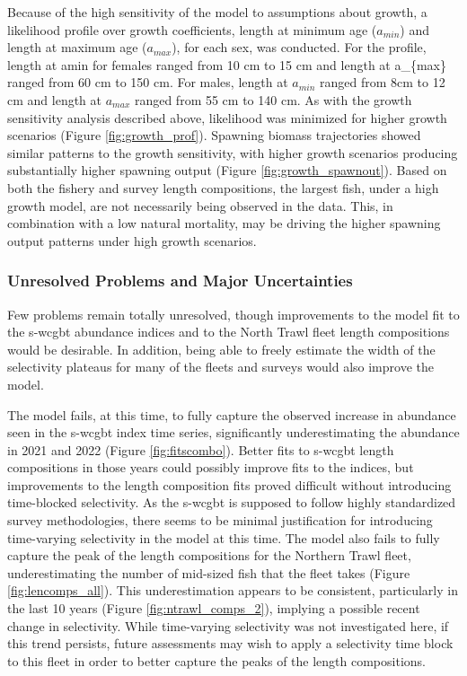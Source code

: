 \documentclass[11pt,
  english,
  letterpaper,
]{article}
\begin{document}
Because of the high sensitivity of the model to assumptions about growth, a likelihood profile over growth coefficients, length at minimum age (\(a_{min}\)) and length at maximum age (\(a_{max}\)), for each sex, was conducted. For the profile, length at amin for females ranged from 10 cm to 15 cm and length at a\_\{max\} ranged from 60 cm to 150 cm. For males, length at \(a_{min}\) ranged from 8cm to 12 cm and length at \(a_{max}\) ranged from 55 cm to 140 cm. As with the growth sensitivity analysis described above, likelihood was minimized for higher growth scenarios (Figure \ref{fig:growth_prof}). Spawning biomass trajectories showed similar patterns to the growth sensitivity, with higher growth scenarios producing substantially higher spawning output (Figure \ref{fig:growth_spawnout}). Based on both the fishery and survey length compositions, the largest fish, under a high growth model, are not necessarily being observed in the data. This, in combination with a low natural mortality, may be driving the higher spawning output patterns under high growth scenarios.

\hypertarget{unresolved-problems-and-major-uncertainties-1}{%
\subsubsection{Unresolved Problems and Major Uncertainties}\label{unresolved-problems-and-major-uncertainties-1}}

Few problems remain totally unresolved, though improvements to the model fit to the \gls{s-wcgbt} abundance indices and to the North Trawl fleet length compositions would be desirable. In addition, being able to freely estimate the width of the selectivity plateaus for many of the fleets and surveys would also improve the model.

The model fails, at this time, to fully capture the observed increase in abundance seen in the \gls{s-wcgbt} index time series, significantly underestimating the abundance in 2021 and 2022 (Figure \ref{fig:fitscombo}). Better fits to \gls{s-wcgbt} length compositions in those years could possibly improve fits to the indices, but improvements to the length composition fits proved difficult without introducing time-blocked selectivity. As the \gls{s-wcgbt} is supposed to follow highly standardized survey methodologies, there seems to be minimal justification for introducing time-varying selectivity in the model at this time. The model also fails to fully capture the peak of the length compositions for the Northern Trawl fleet, underestimating the number of mid-sized fish that the fleet takes (Figure \ref{fig:lencomps_all}). This underestimation appears to be consistent, particularly in the last 10 years (Figure \ref{fig:ntrawl_comps_2}), implying a possible recent change in selectivity. While time-varying selectivity was not investigated here, if this trend persists, future assessments may wish to apply a selectivity time block to this fleet in order to better capture the peaks of the length compositions.
\end{document}
